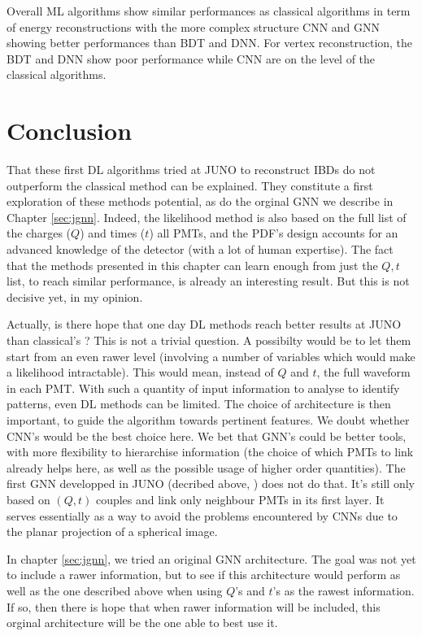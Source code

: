 \documentclass[../main.tex]{subfiles}
\begin{document}
Overall ML algorithms show similar performances as classical algorithms in term of energy reconstructions with the more complex structure CNN and GNN showing better performances than BDT and DNN. For vertex reconstruction, the BDT and DNN show poor performance while CNN are on the level of the classical algorithms.

\section{Conclusion}

That these first DL algorithms tried at JUNO to reconstruct IBDs do not outperform the classical method can be explained. They constitute a first exploration of these methods potential, as do the orginal GNN we describe in Chapter \ref{sec:jgnn}. Indeed, the likelihood method is also based on the full list of the charges ($Q$) and times ($t$) all PMTs, and the PDF's design accounts for an advanced knowledge of the detector (with a lot of human expertise). The fact that the methods presented in this chapter can learn enough from just the $Q,t$ list, to reach similar performance, is already an interesting result. But this is not decisive yet, in my opinion.

Actually, is there hope that one day DL methods reach better results at JUNO than classical's ? This is not a trivial question. A possibilty would be to let them start from an even rawer level (involving a number of variables which would make a likelihood intractable). This would mean, instead of $Q$ and $t$, the full waveform in each PMT. With such a quantity of input information to analyse to identify patterns, even DL methods can be limited. The choice of architecture is then important, to guide the algorithm towards pertinent features. We doubt whether CNN's would be the best choice here. We bet that GNN's could be better tools, with more flexibility to hierarchise information (the choice of which PMTs to link already helps here, as well as the possible usage of higher order quantities). The first GNN developped in JUNO (decribed above, \cite{qian_vertex_2021}) does not do that. It's still only based on $(Q,t)$ couples and link only neighbour PMTs in its first layer. It serves essentially as a way to avoid the problems encountered by CNNs due to the planar projection of a spherical image.

In chapter \ref{sec:jgnn}, we tried an original GNN architecture. The goal was not yet to include a rawer information, but to see if this architecture would perform as well as the one described above when using $Q$'s and $t$'s as the rawest information. If so, then there is hope that when rawer information will be included, this orginal architecture will be the one able to best use it.
\end{document}
